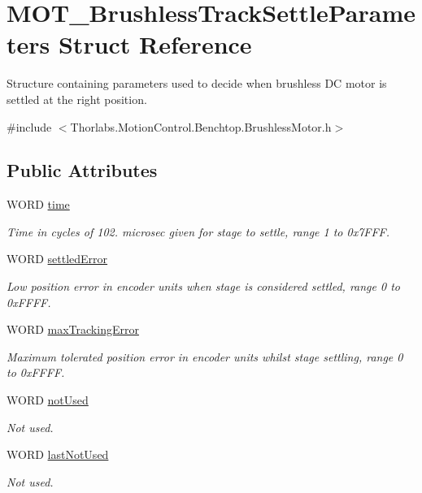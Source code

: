 \hypertarget{struct_m_o_t___brushless_track_settle_parameters}{}\section{M\+O\+T\+\_\+\+Brushless\+Track\+Settle\+Parameters Struct Reference}
\label{struct_m_o_t___brushless_track_settle_parameters}


Structure containing parameters used to decide when brushless DC motor is settled at the right position.  




{\ttfamily \#include $<$Thorlabs.\+Motion\+Control.\+Benchtop.\+Brushless\+Motor.\+h$>$}

\subsection*{Public Attributes}
\begin{DoxyCompactItemize}
\item 
W\+O\+RD \hyperlink{struct_m_o_t___brushless_track_settle_parameters_a5c83be0f26139a6f708a29424cdab022}{time}
\begin{DoxyCompactList}\small\item\em Time in cycles of 102. microsec given for stage to settle, range 1 to 0x7\+F\+FF. \end{DoxyCompactList}\item 
W\+O\+RD \hyperlink{struct_m_o_t___brushless_track_settle_parameters_a7f96ba863a57f1519f49a4000c7b4265}{settled\+Error}
\begin{DoxyCompactList}\small\item\em Low position error in encoder units when stage is considered settled, range 0 to 0x\+F\+F\+FF. \end{DoxyCompactList}\item 
W\+O\+RD \hyperlink{struct_m_o_t___brushless_track_settle_parameters_ae5e2310450c358ef397286a9ce4598a7}{max\+Tracking\+Error}
\begin{DoxyCompactList}\small\item\em Maximum tolerated position error in encoder units whilst stage settling, range 0 to 0x\+F\+F\+FF. \end{DoxyCompactList}\item 
W\+O\+RD \hyperlink{struct_m_o_t___brushless_track_settle_parameters_ac50d2f73f7612952ab5fd5b2083fa4c8}{not\+Used}
\begin{DoxyCompactList}\small\item\em Not used. \end{DoxyCompactList}\item 
W\+O\+RD \hyperlink{struct_m_o_t___brushless_track_settle_parameters_af87f00a398c92f61bde830f72befd210}{last\+Not\+Used}
\begin{DoxyCompactList}\small\item\em Not used. \end{DoxyCompactList}\end{DoxyCompactItemize}


